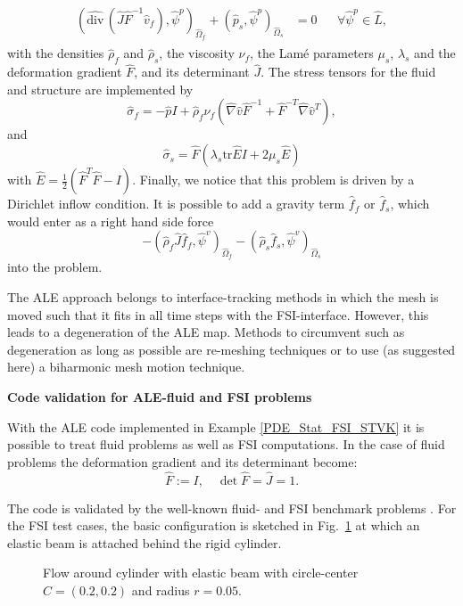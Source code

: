 \begin{Problem}
\begin{eqnarray*}
\begin{aligned}
      (\widehat{\text{div}}\,(\hat J\hat F^{-1}
      \hat v_f),\hat\psi^p)_{\hat\Omega_f} 
      + (\hat p_s ,\hat \psi^p)_{\hat\Omega_s}
      &=0&&\forall\hat\psi^p\in \hat L,
    \end{aligned}
  \end{eqnarray*}  
  with the densities $\hat\rho_f$ and $\hat\rho_s$, 
the viscosity $\nu_f$, the Lam\'e parameters 
$\mu_s$, $\lambda_s$ and the deformation gradient $\hat F$, and its
determinant $\hat J$. The stress tensors for the fluid and structure are
implemented by 
\[
\hat\sigma_f = -\hat pI + \hat\rho_f\nu_f (\hat\nabla\hat v \hat F^{-1}
  + \hat F^{-T} \hat\nabla\hat v^T),
\] 
and 
\[
\hat\sigma_s = \hat F (\lambda_s \text{tr}\hat E I + 2\mu_s \hat E)
\]
with $\hat E = \frac{1}{2}(\hat F^T \hat F - I)$.
Finally, we notice that this problem is driven by a Dirichlet 
inflow condition. It is possible to add a gravity term $\hat f_f$ or 
$\hat f_s$, which 
would enter as a right hand side force 
\[
- (\hat\rho_f \hat J\hat f_f, \hat\psi^v)_{\hat\Omega_f}
      - (\hat\rho_s\hat f_s, \hat\psi^v)_{\hat\Omega_s}
\]
into the problem.
\end{Problem}
The ALE approach belongs to interface-tracking methods in which 
the mesh is moved such that it fits in all time steps with 
the FSI-interface. However, this leads to 
a degeneration of the ALE map. Methods to circumvent such as 
degeneration as long as possible are re-meshing techniques or 
to use (as suggested here) a biharmonic mesh motion technique.






{\bf Code validation for ALE-fluid and FSI problems}

With the ALE code implemented in Example 
\ref{PDE_Stat_FSI_STVK} it is possible to treat fluid 
problems as well as FSI computations. 
In the case of fluid problems the deformation
gradient and its determinant become:
\begin{equation*}
\hat F:= I , \quad \det \hat F = \hat J = 1.
\end{equation*}

The code is validated by the well-known 
fluid- and FSI benchmark problems \cite{SchaeTu96, HrTu06b}. 
For the FSI test cases, 
the basic configuration is 
sketched in Fig.~\ref{configuration_csm_and_fsi_2D} 
at which an elastic beam is attached 
behind the rigid cylinder. 

\begin{figure}[h]
\centering

\caption{Flow around cylinder with elastic beam with 
circle-center $C=(0.2,0.2)$ and radius $r=0.05$.}
\label{configuration_csm_and_fsi_2D}
\end{figure}


